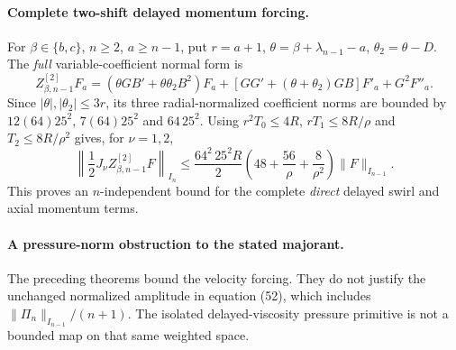 \paragraph{Complete two-shift delayed momentum forcing.}
For $\beta\in\{b,c\}$, $n\ge2$, $a\ge n-1$, put
$r=a+1$, $\theta=\beta+\lambda_{n-1}-a$, $\theta_2=\theta-D$.
The \emph{full} variable-coefficient normal form is
\[
 Z_{\beta,n-1}^{[2]}F_a=
 (\theta GB'+\theta\theta_2B^2)F_a+
 [GG'+(\theta+\theta_2)GB]F'_a+G^2F''_a.
\]
Since $|\theta|,|\theta_2|\le3r$, its three
radial-normalized coefficient norms are bounded by
$12(64)25^2$, $7(64)25^2$ and $64\,25^2$.
Using $r^2T_0\le4R$, $rT_1\le8R/\rho$ and
$T_2\le8R/\rho^2$ gives, for $\nu=1,2$,
\begin{equation}\label{eq:direct-mom-uniform}
 \left\|\frac12J_\nu Z_{\beta,n-1}^{[2]}F\right\|_{I_n}
 \le\frac{64^2\,25^2R}{2}
 \left(48+\frac{56}{\rho}+\frac8{\rho^2}\right)
 \|F\|_{I_{n-1}}.
\end{equation}
This proves an $n$-independent bound for the complete
\emph{direct} delayed swirl and axial momentum terms.

\paragraph{A pressure-norm obstruction to the stated majorant.}
The preceding theorems bound the velocity forcing. They do
not justify the unchanged normalized amplitude in equation
(52), which includes $\|\Pi_n\|_{I_{n-1}}/(n+1)$.
The isolated delayed-viscosity pressure primitive is not
a bounded map on that same weighted space.

